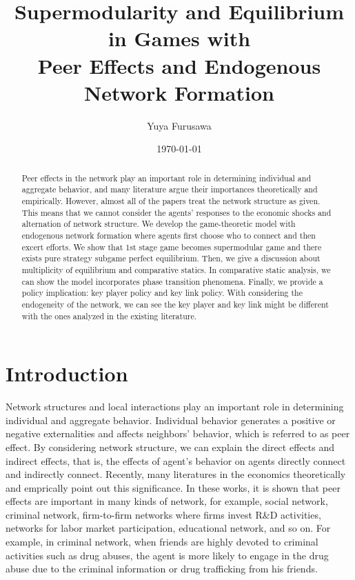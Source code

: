 \documentclass[12pt]{article}
\theoremstyle{definition}
\begin{document}
\title{Supermodularity and Equilibrium in Games with \\ Peer Effects and Endogenous Network Formation}

\author{Yuya Furusawa}

\date{\today}

\maketitle

\begin{abstract}
Peer effects in the network play an important role in determining individual and aggregate behavior, and many literature argue their importances theoretically and empirically.
However, almost all of the papers treat the network structure as given.
This means that we cannot consider the agents' responses to the economic shocks and alternation of network structure.
We develop the game-theoretic model with endogenous network formation where agents first choose who to connect and then excert efforts.
We show that 1st stage game becomes supermodular game and there exists pure strategy subgame perfect equilibrium.
Then, we give a discussion about multiplicity of equilibrium and comparative statics.
In comparative static analysis, we can show the model incorporates phase transition phenomena.
Finally, we provide a policy implication: key player policy and key link policy.
With considering the endogeneity of the network, we can see the key player and key link might be different with the ones analyzed in the existing literature.
\end{abstract}


\section{Introduction}

Network structures and local interactions play an important role in determining individual and aggregate behavior.
Individual behavior generates a positive or negative externalities and affects neighbors' behavior, which is referred to as peer effect.
By considering network structure, we can explain the direct effects and indirect effects, that is, the effects of agent's behavior on agents directly connect and indirectly connect.
Recently, many literatures in the economics theoretically and emprically point out this significance.
In these works, it is shown that peer effects are important in many kinds of network, for example, social network, criminal network, firm-to-firm networks where firms invest R\&D activities, networks for labor market participation, educational network, and so on.
For example, in criminal network, when friends are highly devoted to criminal activities such as drug abuses, the agent is more likely to engage in the drug abuse due to the criminal information or drug trafficking from his friends.
\end{document}

